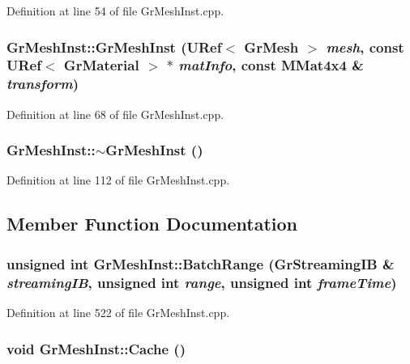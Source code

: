 Definition at line 54 of file GrMeshInst.cpp.\hypertarget{class_gr_mesh_inst_f9d8e471f792ed098eb6659bbc509bdf}{
\subsubsection[{GrMeshInst}]{\setlength{\rightskip}{0pt plus 5cm}GrMeshInst::GrMeshInst ({\bf URef}$<$ {\bf GrMesh} $>$ {\em mesh}, \/  const {\bf URef}$<$ {\bf GrMaterial} $>$ $\ast$ {\em matInfo}, \/  const {\bf MMat4x4} \& {\em transform})}}
\label{class_gr_mesh_inst_f9d8e471f792ed098eb6659bbc509bdf}




Definition at line 68 of file GrMeshInst.cpp.\hypertarget{class_gr_mesh_inst_f18054641cab00c250bc12ff3c08bd68}{
\subsubsection[{$\sim$GrMeshInst}]{\setlength{\rightskip}{0pt plus 5cm}GrMeshInst::$\sim$GrMeshInst ()}}
\label{class_gr_mesh_inst_f18054641cab00c250bc12ff3c08bd68}




Definition at line 112 of file GrMeshInst.cpp.

\subsection{Member Function Documentation}
\hypertarget{class_gr_mesh_inst_cc009c82642378bb9e6640fe329b0584}{
\subsubsection[{BatchRange}]{\setlength{\rightskip}{0pt plus 5cm}unsigned int GrMeshInst::BatchRange ({\bf GrStreamingIB} \& {\em streamingIB}, \/  unsigned int {\em range}, \/  unsigned int {\em frameTime})}}
\label{class_gr_mesh_inst_cc009c82642378bb9e6640fe329b0584}




Definition at line 522 of file GrMeshInst.cpp.\hypertarget{class_gr_mesh_inst_4c6828378720aba2c1d44fc5fbc57abc}{
\subsubsection[{Cache}]{\setlength{\rightskip}{0pt plus 5cm}void GrMeshInst::Cache ()}}
\label{class_gr_mesh_inst_4c6828378720aba2c1d44fc5fbc57abc}




